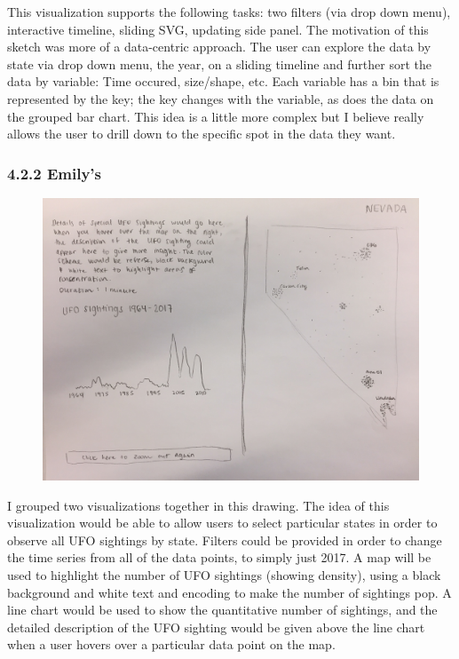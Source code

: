 \documentclass{neu_handout}
\begin{document}
This visualization supports the following tasks: two filters (via drop down menu), interactive timeline, sliding SVG, updating ​side panel. The motivation of this sketch was more of a data-centric approach. The user can explore the data by state via drop down menu, the year, on a sliding timeline and further sort the data by variable: Time occured, size/shape, etc. Each variable has a bin that is represented by the key; the key changes with the variable, as does the data on the grouped bar chart. This idea is a little more complex but I believe really allows the user to drill down to the specific spot in the data they want.

\newpage

\subsubsection*{4.2.2 Emily's}

\begin{figure}[h]
\centering
{
\includegraphics[width=0.9\linewidth]{emily1}
}
\end{figure}

I grouped two visualizations together in this drawing. The idea of this visualization would be able to allow users to select particular states in order to observe all UFO sightings by state. Filters could be provided in order to change the time series from all of the data points, to simply just 2017. A map will be used to highlight the number of UFO sightings (showing density), using a black background and white text and encoding to make the number of sightings pop. A line chart would be used to show the quantitative number of sightings, and the detailed description of the UFO sighting would be given above the line chart when a user hovers over a particular data point on the map.\\\\
\end{document}

